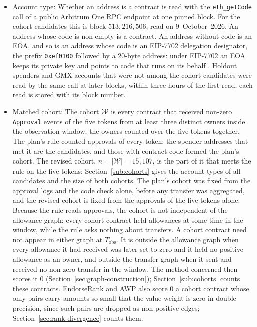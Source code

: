 \begin{itemize}
\item Account type: Whether an address is a contract is read with the \texttt{eth\_getCode} call of a public Arbitrum One RPC endpoint at one pinned block. For the cohort candidates this is block $513{,}216{,}506$, read on 9~October~2026. An address whose code is non-empty is a contract. An address without code is an EOA, and so is an address whose code is an EIP-7702 delegation designator, the prefix \texttt{0xef0100} followed by a 20-byte address: under EIP-7702 an EOA keeps its private key and points to code that runs on its behalf \parencite{buterin2024eip7702}. Holdout spenders and GMX accounts that were not among the cohort candidates were read by the same call at later blocks, within three hours of the first read; each read is stored with its block number.

\item Matched cohort: The cohort $\mathcal{W}$ is every contract that received non-zero \texttt{Approval} events of the five tokens from at least three distinct owners inside the observation window, the owners counted over the five tokens together. The plan's rule counted approvals of every token: the spender addresses that met it are the candidates, and those with contract code formed the plan's cohort. The revised cohort, $n=|\mathcal{W}|=15{,}107$, is the part of it that meets the rule on the five tokens; Section~\ref{sub:cohorts} gives the account types of all candidates and the size of both cohorts. The plan's cohort was fixed from the approval logs and the code check alone, before any transfer was aggregated, and the revised cohort is fixed from the approvals of the five tokens alone. Because the rule reads approvals, the cohort is not independent of the allowance graph: every cohort contract held allowances at some time in the window, while the rule asks nothing about transfers. A cohort contract need not appear in either graph at $T_{\mathrm{obs}}$. It is outside the allowance graph when every allowance it had received was later set to zero and it held no positive allowance as an owner, and outside the transfer graph when it sent and received no non-zero transfer in the window. The method concerned then scores it $0$ (Section~\ref{sec:graph-construction}); Section~\ref{sub:cohorts} counts these contracts. EndorseRank and AWP also score $0$ a cohort contract whose only pairs carry amounts so small that the value weight is zero in double precision, since such pairs are dropped as non-positive edges; Section~\ref{sec:rank-divergence} counts them.


\end{itemize}
